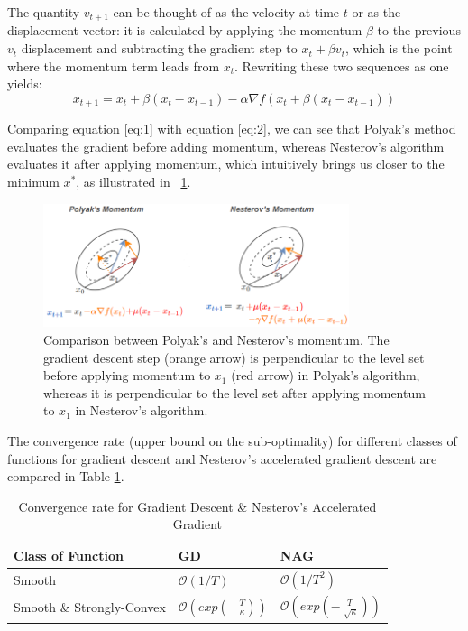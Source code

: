 \documentclass{article}
\begin{document}

The quantity $v_{t+1}$ can be thought of as the velocity at time $t$ or as the displacement vector: it is calculated by applying the  momentum $\beta$ to the previous $v_t$ displacement and subtracting the gradient step to $x_t + \beta v_t$, which is the point where the momentum term leads from $x_t$. 
Rewriting these two sequences as one yields:
\begin{equation} \label{eq:2}
	x_{t+1} = x_t + \beta(x_t - x_{t-1}) - \alpha \nabla f(x_t + \beta (x_t - x_{t-1}))
\end{equation}

Comparing equation \eqref{eq:1} with equation \eqref{eq:2}, we can see that Polyak's method evaluates the gradient before adding momentum, whereas Nesterov's algorithm evaluates it after applying momentum, which intuitively brings us closer to the minimum $x^*$, as illustrated in \figurename \ \ref{fig:momentum_comparison}.

\begin{figure}[H]
  \centering
  \includegraphics[width=0.8\textwidth]{images/polyak_diff1.PNG}
  \caption{Comparison between Polyak's and Nesterov's momentum. The gradient descent step (orange arrow) is perpendicular to the level set before applying momentum to $x_1$ (red arrow) in Polyak's algorithm, whereas it is perpendicular to the level set after applying momentum to $x_1$ in Nesterov's algorithm.}
  \label{fig:momentum_comparison}
\end{figure}

The convergence rate (upper bound on the sub-optimality) for different classes of functions for gradient descent and Nesterov's accelerated gradient descent are compared in Table \ref{labt1}.

\begin{table}[H]
  \caption{Convergence rate for Gradient Descent \& Nesterov's Accelerated Gradient}
  \label{sample-table}
  \centering
  \begin{tabular}{lll}
   \\
    Class of Function & GD & NAG  \\
    \midrule
    Smooth & $\mathcal O(1/T)$ & $ \mathcal O(1/T^2)$   \\
    Smooth \& Strongly-Convex & $ \mathcal O\left(exp \left(-\frac{T}{\kappa}\right)\right)$  & $ \mathcal O\left(exp \left(-\frac{T}{\sqrt[]{\kappa}}\right)\right)$\\
    \bottomrule
  \end{tabular}
  \label{labt1}
\end{table}
\end{document}
